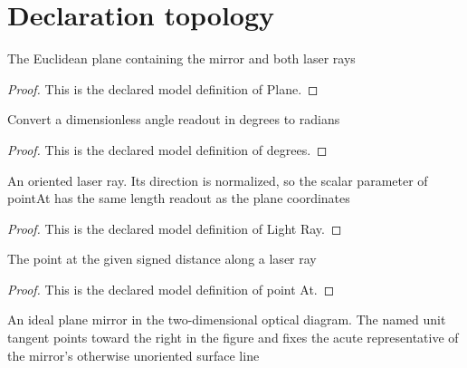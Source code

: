 \section{Declaration topology}
\begin{definition}[Plane]
  \label{def:physics:phyx-mini-0060:phyxminiproblems-problemphyxmini0060-plane}
  The Euclidean plane containing the mirror and both laser rays
\end{definition}
\begin{proof}
  This is the declared model definition of Plane.
\end{proof}
\begin{definition}[degrees]
  \label{def:physics:phyx-mini-0060:phyxminiproblems-problemphyxmini0060-degrees}
  Convert a dimensionless angle readout in degrees to radians
\end{definition}
\begin{proof}
  This is the declared model definition of degrees.
\end{proof}
\begin{definition}
  \label{def:physics:phyx-mini-0060:phyxminiproblems-problemphyxmini0060-lightray}
  An oriented laser ray. Its direction is normalized, so the scalar parameter of pointAt has the same length readout as the plane coordinates
\end{definition}
\begin{proof}
  This is the declared model definition of Light Ray.
\end{proof}
\begin{definition}[point At]
  \label{def:physics:phyx-mini-0060:phyxminiproblems-problemphyxmini0060-lightray-pointat}
  The point at the given signed distance along a laser ray
\end{definition}
\begin{proof}
  This is the declared model definition of point At.
\end{proof}
\begin{definition}
  \label{def:physics:phyx-mini-0060:phyxminiproblems-problemphyxmini0060-planemirror}
  An ideal plane mirror in the two-dimensional optical diagram. The named unit tangent points toward the right in the figure and fixes the acute representative of the mirror's otherwise unoriented surface line
\end{definition}
